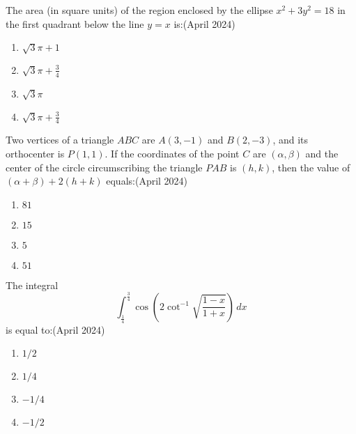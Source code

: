 \item The area (in square units) of the region enclosed by the ellipse $x^2 + 3y^2 = 18$ in the first quadrant below the line $y = x$ is:\hfill{(April 2024)}
    \begin{enumerate}
        \item ${\sqrt{3}\pi + 1}$
        \item $\sqrt{3}\pi +\frac{3}{4}$
        \item ${\sqrt{3}\pi}$
        \item $\sqrt{3}\pi +\frac{3}{4}$
    \end{enumerate}
\item Two vertices of a triangle $ABC$ are $A(3, -1)$ and $B(2, -3)$, and its orthocenter is $P(1,1)$. If the coordinates of the point $C$ are $(\alpha,\beta)$ and the center of the circle circumscribing the triangle $PAB$ is $(h,k)$, then the value of $(\alpha+\beta) + 2(h+k)$ equals:\hfill{(April 2024)}
 \begin{enumerate}
        \item $81$
        \item $15$
        \item $5$
        \item $51$
    \end{enumerate}
		
    \item The integral
    \begin{equation*}
\int_{\frac{1}{4}}^{\frac{3}{4}} \cos\left( 2 \cot^{-1} \sqrt{\frac{1 - x}{1 + x}} \right) \, dx
\end{equation*}
	is equal to:\hfill{(April 2024)}
    \begin{enumerate}
        \item $1/2$
        \item $1/4$
        \item $-1/4$
        \item $-1/2$
    \end{enumerate}
